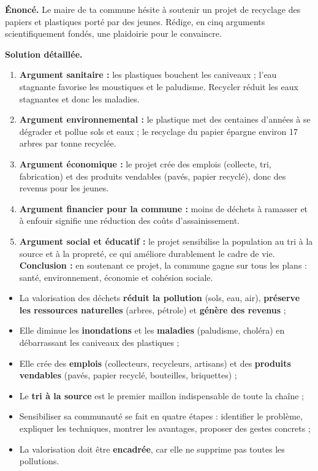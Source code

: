 \documentclass[11pt]{article}
\begin{document}
\begin{exoresolu}
\textbf{Énoncé.} Le maire de ta commune hésite à soutenir un projet de recyclage des papiers et plastiques porté par des jeunes. Rédige, en cinq arguments scientifiquement fondés, une plaidoirie pour le convaincre.

\tcblower
\textbf{Solution détaillée.}
\begin{enumerate}
\item \textbf{Argument sanitaire :} les plastiques bouchent les caniveaux ; l'eau stagnante favorise les moustiques et le paludisme. Recycler réduit les eaux stagnantes et donc les maladies.
\item \textbf{Argument environnemental :} le plastique met des centaines d'années à se dégrader et pollue sols et eaux ; le recyclage du papier épargne environ 17 arbres par tonne recyclée.
\item \textbf{Argument économique :} le projet crée des emplois (collecte, tri, fabrication) et des produits vendables (pavés, papier recyclé), donc des revenus pour les jeunes.
\item \textbf{Argument financier pour la commune :} moins de déchets à ramasser et à enfouir signifie une réduction des coûts d'assainissement.
\item \textbf{Argument social et éducatif :} le projet sensibilise la population au tri à la source et à la propreté, ce qui améliore durablement le cadre de vie.
\textbf{Conclusion :} en soutenant ce projet, la commune gagne sur tous les plans : santé, environnement, économie et cohésion sociale.
\end{enumerate}
\end{exoresolu}

\begin{aretenir}
\begin{itemize}
\item La valorisation des déchets \textbf{réduit la pollution} (sols, eau, air), \textbf{préserve les ressources naturelles} (arbres, pétrole) et \textbf{génère des revenus} ;
\item Elle diminue les \textbf{inondations} et les \textbf{maladies} (paludisme, choléra) en débarrassant les caniveaux des plastiques ;
\item Elle crée des \textbf{emplois} (collecteurs, recycleurs, artisans) et des \textbf{produits vendables} (pavés, papier recyclé, bouteilles, briquettes) ;
\item Le \textbf{tri à la source} est le premier maillon indispensable de toute la chaîne ;
\item Sensibiliser sa communauté se fait en quatre étapes : identifier le problème, expliquer les techniques, montrer les avantages, proposer des gestes concrets ;
\item La valorisation doit être \textbf{encadrée}, car elle ne supprime pas toutes les pollutions.
\end{itemize}
\end{aretenir}
\end{document}
